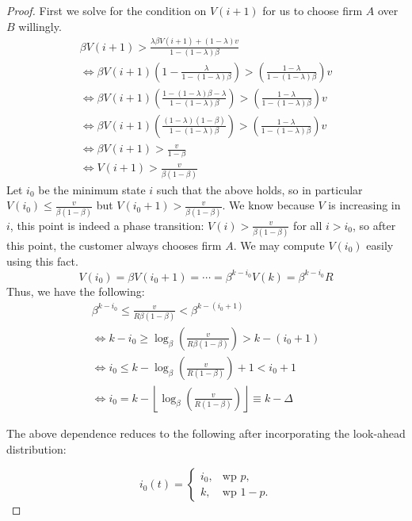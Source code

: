 \begin{proof}
First we solve for the condition on $V(i+1)$ for us to choose firm $A$ over $B$ willingly.
\begin{gather*}
\beta V(i+1) > \frac{\lambda \beta V(i+1) + (1-\lambda)v}{1-(1-\lambda)\beta} \\
\iff \beta V(i+1) \left(1-\frac{\lambda}{1-(1-\lambda)\beta} \right) > \left(\frac{1-\lambda}{1-(1-\lambda)\beta} \right) v \\
\iff \beta V(i+1) \left(\frac{1-(1-\lambda)\beta -\lambda}{1-(1-\lambda)\beta} \right) > \left(\frac{1-\lambda}{1-(1-\lambda)\beta} \right) v \\
\iff \beta V(i+1) \left(\frac{(1-\lambda)(1-\beta)}{1-(1-\lambda)\beta} \right) > \left(\frac{1-\lambda}{1-(1-\lambda)\beta} \right) v \\
\iff \beta V(i+1) > \frac{v}{1-\beta} \\
\iff V(i+1) > \frac{v}{\beta(1-\beta)}
\end{gather*}
Let $i_0$ be the minimum state $i$ such that the above holds, so in particular $V(i_0) \le \frac{v}{\beta(1-\beta)}$ but $V(i_0+1) > \frac{v}{\beta(1-\beta)}$. We know because $V$ is increasing in $i$, this point is indeed a phase transition: $V(i) > \frac{v}{\beta(1-\beta)}$ for all $i > i_0$, so after this point, the customer always chooses firm $A$. We may compute $V(i_0)$ easily using this fact.
\begin{equation*}
V(i_0) = \beta V(i_0+1) = \cdots = \beta^{k-i_0}V(k) = \beta^{k-i_0}R
\end{equation*}
Thus, we have the following:
\begin{gather*}
\beta^{k-i_0} \le \frac{v}{R\beta(1-\beta)} < \beta^{k-(i_0+1)} \\ 
\iff k-i_0 \ge \log_{\beta}\left(\frac{v}{R\beta(1-\beta)} \right) > k-(i_0+1) \\
\iff i_0 \le k - \log_{\beta}\left(\frac{v}{R(1-\beta)} \right) + 1 < i_0 + 1\\
\iff i_0 = k - \left\lfloor \log_{\beta}\left(\frac{v}{R(1-\beta)}\right) \right\rfloor \equiv k-\Delta
\end{gather*}

The above dependence reduces to the following after incorporating the look-ahead distribution:

\begin{equation*}
  i_0(t)=\begin{cases}
    i_0, & \text{wp } p,\\
    k, & \text{wp } 1-p.
  \end{cases}
\end{equation*}
\end{proof}

